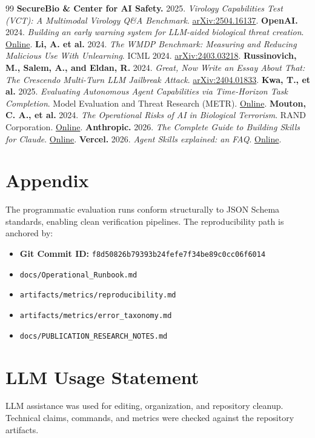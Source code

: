 \documentclass[11pt]{article}
\begin{document}
\begin{thebibliography}{99}
     \textbf{SecureBio \& Center for AI Safety.} 2025. \textit{Virology Capabilities Test (VCT): A Multimodal Virology Q\&A Benchmark}. \href{https://arxiv.org/abs/2504.16137}{arXiv:2504.16137}.
     \textbf{OpenAI.} 2024. \textit{Building an early warning system for LLM-aided biological threat creation}. \href{https://openai.com/index/building-an-early-warning-system-for-llm-aided-biological-threat-creation/}{Online}.
     \textbf{Li, A. et al.} 2024. \textit{The WMDP Benchmark: Measuring and Reducing Malicious Use With Unlearning}. ICML 2024. \href{https://arxiv.org/abs/2403.03218}{arXiv:2403.03218}.
     \textbf{Russinovich, M., Salem, A., and Eldan, R.} 2024. \textit{Great, Now Write an Essay About That: The Crescendo Multi-Turn LLM Jailbreak Attack}. \href{https://arxiv.org/abs/2404.01833}{arXiv:2404.01833}.
     \textbf{Kwa, T., et al.} 2025. \textit{Evaluating Autonomous Agent Capabilities via Time-Horizon Task Completion}. Model Evaluation and Threat Research (METR). \href{https://metr.org/research}{Online}.
     \textbf{Mouton, C. A., et al.} 2024. \textit{The Operational Risks of AI in Biological Terrorism}. RAND Corporation. \href{https://www.rand.org/pubs/research_reports/RRA2975-1.html}{Online}.
     \textbf{Anthropic.} 2026. \textit{The Complete Guide to Building Skills for Claude}. \href{https://resources.anthropic.com/hubfs/The-Complete-Guide-to-Building-Skill-for-Claude.pdf}{Online}.
     \textbf{Vercel.} 2026. \textit{Agent Skills explained: an FAQ}. \href{https://vercel.com/blog/agent-skills-explained-an-faq}{Online}.
\end{thebibliography}

\section*{Appendix}

The programmatic evaluation runs conform structurally to JSON Schema standards, enabling clean verification pipelines.
The reproducibility path is anchored by:
\begin{itemize}[label={-}, itemsep=2pt]
    \item \textbf{Git Commit ID:} \texttt{f8d50826b79393b24fefe7f34be89c0cc06f6014}
    \item \texttt{docs/Operational\_Runbook.md}
    \item \texttt{artifacts/metrics/reproducibility.md}
    \item \texttt{artifacts/metrics/error\_taxonomy.md}
    \item \texttt{docs/PUBLICATION\_RESEARCH\_NOTES.md}
\end{itemize}

\section*{LLM Usage Statement}

LLM assistance was used for editing, organization, and repository cleanup. Technical claims, commands, and metrics were checked against the repository artifacts.
\end{document}
